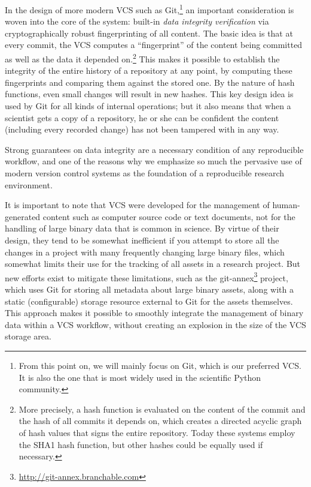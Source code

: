 \documentclass[11pt,oneside,english]{article}
\begin{document}
In the design of more modern VCS such as Git,\footnote{From this point on, we
will mainly focus on Git, which is our preferred VCS. It is also the one that
is most widely used in the scientific Python community.} an important
consideration is woven into the core of the system: built-in \emph{data
  integrity verification} via cryptographically robust fingerprinting of all
content.  The basic idea is that at every commit, the VCS computes a
``fingerprint'' of the content being committed as well as the data it depended
on.\footnote{More precisely, a hash function is evaluated on the content of the
  commit and the hash of all commits it depends on, which creates a directed
  acyclic graph of hash values that signs the entire repository.  Today these
  systems employ the SHA1 hash function, but other hashes could be equally used
  if necessary.}  This makes it possible to
establish the integrity of the entire history of a repository at any point, by
computing these fingerprints and comparing them against the stored one.  By the
nature of hash functions, even small changes will result in new hashes.
This key design idea is used by Git for all kinds of internal
operations; but it also means that when a scientist gets a copy of a
repository, he or she can be confident the content (including every recorded
change) has not been tampered with in any way.

Strong guarantees on data integrity are a necessary condition of any
reproducible workflow, and one of the reasons why we emphasize so much the
pervasive use of modern version control systems as the foundation of a
reproducible research environment.

It is important to note that VCS were developed for the management of
human-generated content such as computer source code or text documents, not for
the handling of large binary data that is common in science.  By virtue of
their design, they tend to be somewhat inefficient if you attempt to store all
the changes in a project with many frequently changing large binary files,
which somewhat limits their use for the tracking of all assets in a research
project.  But new efforts exist to mitigate these limitations, such as the
git-annex\footnote{\url{http://git-annex.branchable.com}} project, which uses
Git for storing all metadata about large binary assets, along with a static
(configurable) storage resource external to Git for the assets themselves.
This approach makes it possible to smoothly integrate the management of binary
data within a VCS workflow, without creating an explosion in the size of the
VCS storage area.
\end{document}
